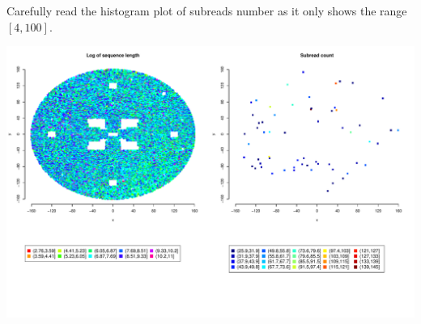 \documentclass[notitlepage,a4paper]{article}\usepackage[]{graphicx}\usepackage[]{color}
\makeatletter
\def\maxwidth{ %
  \ifdim\Gin@nat@width>\linewidth
    \linewidth
  \else
    \Gin@nat@width
  \fi
}
\newenvironment{knitrout}{}{} %
\makeatother
\begin{document}
Carefully read the histogram plot of subreads number as it only shows the range $[4,100]$. 

\begin{knitrout}
\color{fgcolor}
\includegraphics[width=\maxwidth]{figure/unnamed-chunk-5-1} 

\end{knitrout}
\end{document}
